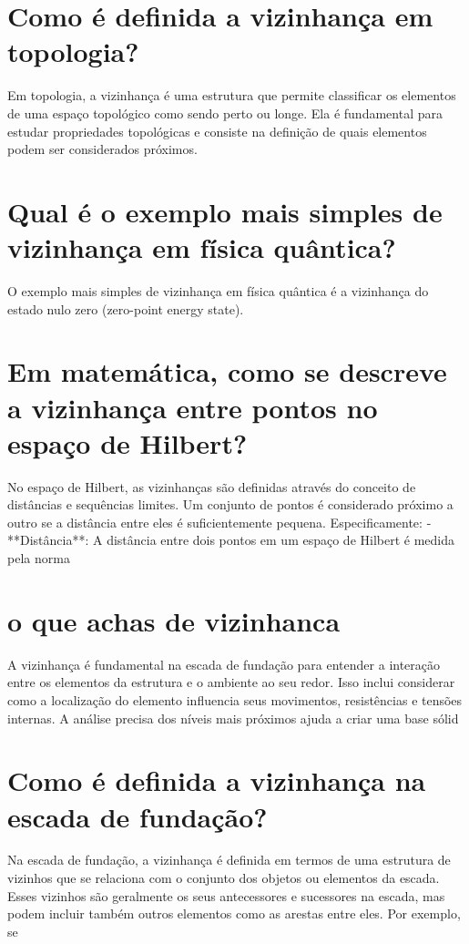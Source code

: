 \documentclass[11pt,a4paper]{article}
\begin{document}
\section{Como é definida a vizinhança em topologia?}
Em topologia, a vizinhança é uma estrutura que permite classificar os elementos de uma espaço topológico como sendo perto ou longe. Ela é fundamental para estudar propriedades topológicas e consiste na definição de quais elementos podem ser considerados próximos.

\section{Qual é o exemplo mais simples de vizinhança em física quântica?}
O exemplo mais simples de vizinhança em física quântica é a vizinhança do estado nulo zero (zero-point energy state).

\section{Em matemática, como se descreve a vizinhança entre pontos no espaço de Hilbert?}
No espaço de Hilbert, as vizinhanças são definidas através do conceito de distâncias e sequências limites. Um conjunto de pontos é considerado próximo a outro se a distância entre eles é suficientemente pequena. Especificamente: - **Distância**: A distância entre dois pontos em um espaço de Hilbert é medida pela norma 

\section{o que achas de vizinhanca}
A vizinhança é fundamental na escada de fundação para entender a interação entre os elementos da estrutura e o ambiente ao seu redor. Isso inclui considerar como a localização do elemento influencia seus movimentos, resistências e tensões internas. A análise precisa dos níveis mais próximos ajuda a criar uma base sólid

\section{Como é definida a vizinhança na escada de fundação?}
Na escada de fundação, a vizinhança é definida em termos de uma estrutura de vizinhos que se relaciona com o conjunto dos objetos ou elementos da escada. Esses vizinhos são geralmente os seus antecessores e sucessores na escada, mas podem incluir também outros elementos como as arestas entre eles. Por exemplo, se
\end{document}
